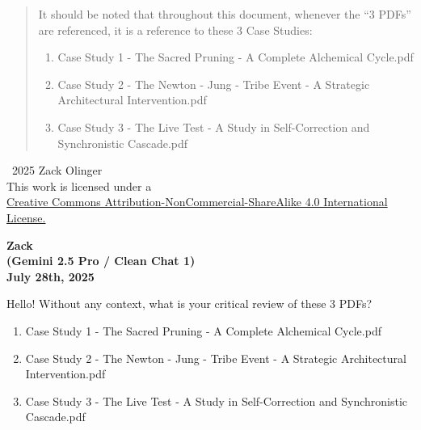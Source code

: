 \documentclass{article}
\newcommand{\licenseURL}{https://creativecommons.org/licenses/by-nc-sa/4.0/legalcode.txt}
\begin{document}
\begin{titlepage}
\begin{abstract}
    \newpage
    \thispagestyle{empty} %

    It should be noted that throughout this document, whenever the ``3 PDFs'' are referenced, it is a reference to these 3 Case Studies:

    \medskip

    \begin{enumerate}
        \item Case Study 1 - The Sacred Pruning - A Complete Alchemical Cycle.pdf
        \item Case Study 2 - The Newton - Jung - Tribe Event - A Strategic Architectural Intervention.pdf
        \item Case Study 3 - The Live Test - A Study in Self-Correction and Synchronistic Cascade.pdf
    \end{enumerate}

    \medskip

    \end{abstract}
\vfill
    
    \begin{center}
        \textcopyright\ 2025 Zack Olinger \\
        This work is licensed under a \\
        \href{\licenseURL}{Creative Commons Attribution-NonCommercial-ShareAlike 4.0 International License.}
    \end{center}

\end{titlepage}

\setcounter{page}{1} %

\begin{center}
\textbf{Zack}\\
\textbf{(Gemini 2.5 Pro / Clean Chat 1)}\\
\textbf{July 28th, 2025}
\end{center}

Hello! Without any context, what is your critical review of these 3
PDFs?

\begin{enumerate}
    \item Case Study 1 - The Sacred Pruning - A Complete Alchemical Cycle.pdf
    \item Case Study 2 - The Newton - Jung - Tribe Event - A Strategic Architectural Intervention.pdf
    \item Case Study 3 - The Live Test - A Study in Self-Correction and Synchronistic Cascade.pdf
\end{enumerate}
\end{document}
